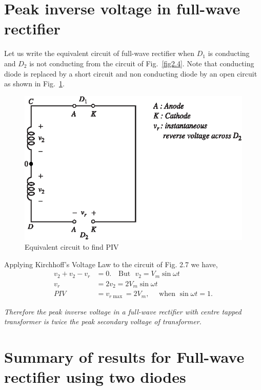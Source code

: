 \section{Peak inverse voltage in full-wave rectifier}\label{sec2.14}

Let us write the equivalent circuit of full-wave rectifier when $D_1$
is conducting and $D_2$ is not conducting from the circuit of
Fig.~\ref{fig2.4}. Note that conducting diode is replaced by a short circuit
and non conducting diode by an open circuit as shown in Fig.~\ref{fig2.7}.
\begin{figure}[H]
\centering
\includegraphics{chap2/add-fig/S3-EE-02-007.eps}
\caption{Equivalent circuit to find PIV}\label{fig2.7}
\end{figure}

\eject

Applying Kirchhoff's Voltage Law to the circuit of Fig. 2.7 we have,
\begin{align*}
v_2 + v_2 - v_r & = 0. \text{~~ But~~} v_2 = V_m \sin \omega t\\
v_r & = 2 v_2 = 2 V_m \sin \omega t\\
PIV & = v_{r \max} = 2 V_m, \quad \text{ when } \sin \omega t =1.
\end{align*}

{\em Therefore the peak inverse voltage in a full-wave rectifier with
centre tapped transformer is twice the peak secondary voltage of
transformer.}

\section{Summary of results for Full-wave rectifier using two diodes}\label{sec2.15}

